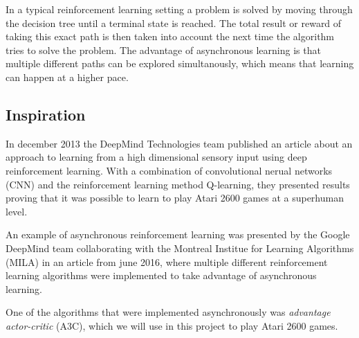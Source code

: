 \documentclass[11pt]{article}
\begin{document}
In a typical reinforcement learning setting a problem is solved
by moving through the decision tree until a terminal state is reached.
The total result or reward of taking this exact path is then
taken into account the next time the algorithm tries to solve the problem.
The advantage of asynchronous learning is that multiple different paths
can be explored simultanously, which means that learning can happen at
a higher pace.

\subsection{Inspiration}

In december 2013 the DeepMind Technologies team published an article
about an approach to learning from a high dimensional sensory input
using deep reinforcement learning\cite{dqn}.
With a combination of convolutional nerual networks (CNN) and
the reinforcement learning method Q-learning\cite{RLbook}, they
presented results proving that it was possible to learn to play Atari
2600 games at a superhuman level.



An example of asynchronous reinforcement learning was presented by the
Google DeepMind team collaborating with the Montreal Institue for Learning
Algorithms (MILA) in an article from june 2016, where multiple different
reinforcement learning algorithms were implemented to take advantage of
asynchronous learning\cite{a3c}.

One of the  algorithms that were implemented asynchronously
was \textit{advantage actor-critic} (A3C), which we will use in this
project to play Atari 2600 games.


%
%
\end{document}
